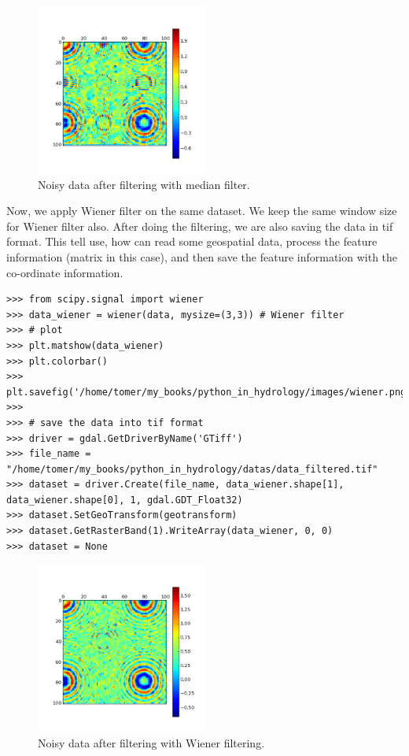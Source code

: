 \documentclass[10pt]{book}
\begin{document}
{\beforefig
\begin{figure}[h!]
  \centering
    \includegraphics[width=0.5\textwidth]{images/median.png}
  \caption{Noisy data after filtering with median filter.}
   \label{fig:median}
\end{figure}
\afterfig
{}
Now, we apply Wiener filter on the same dataset. We keep the same window size for Wiener filter also. After doing the filtering, we are also saving the data in tif format. This tell use, how can read some geospatial data, process the feature information (matrix in this case), and then save the feature information with the co-ordinate information. 
\beforeverb \begin{verbatim}
>>> from scipy.signal import wiener
>>> data_wiener = wiener(data, mysize=(3,3)) # Wiener filter 
>>> # plot
>>> plt.matshow(data_wiener)
>>> plt.colorbar()
>>> plt.savefig('/home/tomer/my_books/python_in_hydrology/images/wiener.png')
>>> 
>>> # save the data into tif format
>>> driver = gdal.GetDriverByName('GTiff')
>>> file_name = "/home/tomer/my_books/python_in_hydrology/datas/data_filtered.tif"
>>> dataset = driver.Create(file_name, data_wiener.shape[1], data_wiener.shape[0], 1, gdal.GDT_Float32)
>>> dataset.SetGeoTransform(geotransform)
>>> dataset.GetRasterBand(1).WriteArray(data_wiener, 0, 0)
>>> dataset = None
\end{verbatim} \afterverb

\beforefig
\begin{figure}[h!]
  \centering
    \includegraphics[width=0.5\textwidth]{images/wiener.png}
  \caption{Noisy data after filtering with Wiener filtering.}
   \label{fig:wiener}
\end{figure}
\afterfig

}
\end{document}
